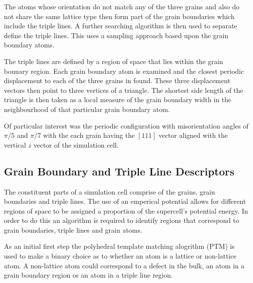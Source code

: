 \documentclass[12pt,a4paper]{book}
\begin{document}
The atoms whose orientation do not match any of the three grains and also do not share the same lattice type then form part of the grain boundaries which include the triple lines. A further searching algorithm is then used to separate define the triple lines. This uses a sampling approach based upon the grain boundary atoms. 

The triple lines are defined by a region of space that lies within the grain bounary region. Each grain boundary atom is examined and the closest periodic displacement to each of the three grains in found. These three displacement vectors then point to three vertices of a triangle. The shortest side length of the triangle is then taken as a local measure of the grain boundary width in the neighbourhood of that particular grain boundary atom.  

Of particular interest was the periodic configuration with misorientation angles of $\pi/5$ and $\pi/7$ with the each grain having the $[1 1 1]$ vector aligned with the vertical $z$ vector of the simulation cell.

\subsection{Grain Boundary and Triple Line Descriptors}

The constituent parts of a simulation cell comprise of the grains, grain boundaries and triple lines. The use of an emperical potential allows for different regions of space to be assigned a proportion of the supercell's potential energy. In order to do this an algorithm is required to identify regions that correspond to grain boundaries, triple lines and grain atoms.

As an initial first step the polyhedral template matching alogrithm (PTM) is used to make a binary choice as to whether an atom is a lattice or non-lattice atom. A non-lattice atom could correspond to a defect in the bulk, an atom in a grain boundary region  or an atom in a triple line region.
\end{document}
